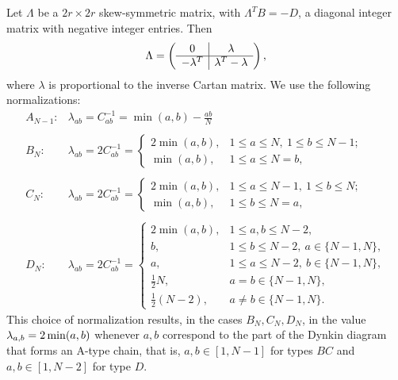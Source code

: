 \documentclass[12pt]{amsart}
\newcommand{\half}{\frac12}
\numberwithin{equation}{section}
\numberwithin{table}{section}
\begin{document}
Let $\Lambda$ be a $2r\times 2r$ skew-symmetric matrix,
with $\Lambda^T B = -D$, a diagonal integer matrix with negative integer entries. Then
\begin{equation}\label{LambdaMatrix}
\Lambda = \left(\begin{array}{c | c } 0 & \lambda \\ \hline -\lambda^T & \lambda^T- \lambda \end{array}
\right),
\end{equation}
where $\lambda$ is proportional to the inverse Cartan matrix.
We use the following normalizations:
\begin{equation}\label{lambda}
\begin{array}{rl}
A_{N-1}: & \lambda_{ab}=C^{-1}_{ab}
=  {\min}(a,b) - \frac{ab}{N} \\ \\
B_N: & \lambda_{ab}= 2 C^{-1}_{ab} =
\left\{ \begin{array}{ll} 2 {\min}(a,b), & 1\leq a\leq N,\ 1\leq b\leq N-1;\\ 
{\min}(a,b), & 1\leq a\leq N=b ,
\end{array}
\right.  
\\ \\
C_N: & \lambda_{ab}= 2 C^{-1}_{ab} =
\left\{ \begin{array}{ll} 2 {\min}(a,b), & 1\leq a\leq N-1,\ 1\leq b\leq N;\\
{\min}(a,b), & 1\leq b\leq N=a,
\end{array}
\right.
\\ \\
D_N: & \lambda_{ab}=2 C^{-1}_{ab} 
=\left\{ \begin{array}{ll}
 2 {\min}(a,b), &  1\leq a,b\leq N-2,\\
b, &  1\leq b\leq N-2,\  a\in \{N-1,N\},\\
a, &  1\leq a\leq N-2,\  b \in \{N-1,N\},\\
\half N, & a=b \in \{N-1,N\},\\
\half (N-2), & a\neq b \in \{N-1,N\}.
\end{array} 
\right.
\end{array}
\end{equation}
This choice of normalization results, in the cases $B_N,C_N,D_N$, in the  value 
$\lambda_{a,b}=2\, {\rm min}(a,b)$ whenever $a,b$ correspond
to the part of the Dynkin diagram that forms an A-type chain, that is, $a,b \in [1,N-1]$ for types $BC$ and $a,b\in [1,N-2]$ for type $D$.
\end{document}
